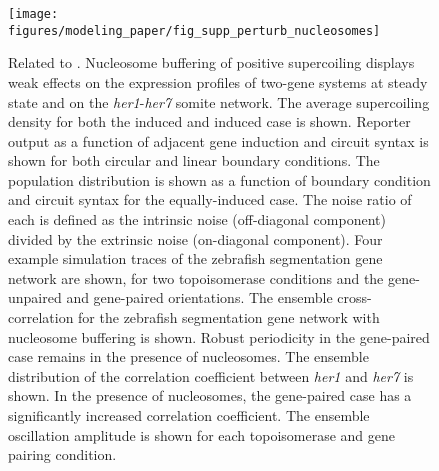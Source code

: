 \documentclass[11pt]{article} %
\begin{document}
\begin{figure}[htbp]
    \centering
    {\texttt{[image: figures/modeling\_paper/fig\_supp\_perturb\_nucleosomes]}
    \label{fig:supp:nucleosome_sc_density}
    \label{fig:supp:nucleosome_induction_sweep}
    \label{fig:supp:nucleosome_joint_distribution}
    \label{fig:supp:nucleosome_zinani_examples}
    \label{fig:supp:nucleosome_zinani_crosscorr}
    \label{fig:supp:nucleosome_zinani_correlation_coefficient}
    \label{fig:supp:nucleosome_zinani_oscillation_amplitude}
    }
\end{figure}
\begin{figure}
    \ContinuedFloat
    \caption{Related to .
        Nucleosome buffering of positive supercoiling displays weak effects on the expression profiles of two-gene systems at steady state and on the \textit{her1}-\textit{her7} somite network.
         The average supercoiling density for both the induced and induced case is shown.
         Reporter output as a function of adjacent gene induction and circuit syntax is shown for both circular and linear boundary conditions.
         The population distribution is shown as a function of boundary condition and circuit syntax for the equally-induced case. The noise ratio of each is defined as the intrinsic noise (off-diagonal component) divided by the extrinsic noise (on-diagonal component).
         Four example simulation traces of the zebrafish segmentation gene network are shown, for two topoisomerase conditions and the gene-unpaired and gene-paired orientations.
         The ensemble cross-correlation for the zebrafish segmentation gene network with nucleosome buffering is shown. Robust periodicity in the gene-paired case remains in the presence of nucleosomes.
         The ensemble distribution of the correlation coefficient between \textit{her1} and \textit{her7} is shown. In the presence of nucleosomes, the gene-paired case has a significantly increased correlation coefficient.
         The ensemble oscillation amplitude is shown for each topoisomerase and gene pairing condition.
    }
    \label{fig:top:supp_perturb_nucleosomes}
\end{figure}
\end{document}
